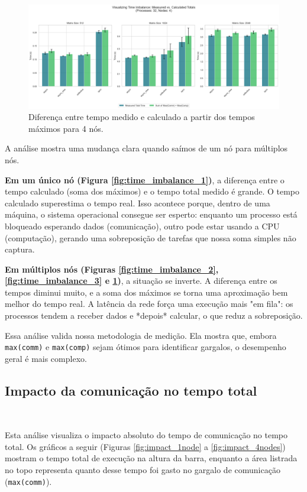 \documentclass{article}
\begin{document}
\begin{figure}[H]
    \centering
    \includegraphics[width=1.0\linewidth]{images/time_imbalance_4nodes.png}
    \caption{Diferença entre tempo medido e calculado a partir dos tempos máximos para 4 nós.}
    \label{fig:time_imbalance_4}
\end{figure}

A análise mostra uma mudança clara quando saímos de um nó para múltiplos nós.

\textbf{Em um único nó (Figura \ref{fig:time_imbalance_1})}, a diferença entre o tempo calculado (soma dos máximos) e o tempo total medido é grande. O tempo calculado superestima o tempo real. Isso acontece porque, dentro de uma máquina, o sistema operacional consegue ser esperto: enquanto um processo está bloqueado esperando dados (comunicação), outro pode estar usando a CPU (computação), gerando uma sobreposição de tarefas que nossa soma simples não captura.

\textbf{Em múltiplos nós (Figuras \ref{fig:time_imbalance_2}, \ref{fig:time_imbalance_3} e \ref{fig:time_imbalance_4})}, a situação se inverte. A diferença entre os tempos diminui muito, e a soma dos máximos se torna uma aproximação bem melhor do tempo real. A latência da rede força uma execução mais "em fila": os processos tendem a receber dados e *depois* calcular, o que reduz a sobreposição.

Essa análise valida nossa metodologia de medição. Ela mostra que, embora \texttt{max(comm)} e \texttt{max(comp)} sejam ótimos para identificar gargalos, o desempenho geral é mais complexo.

\subsection{Impacto da comunicação no tempo total}
\

Esta análise visualiza o impacto absoluto do tempo de comunicação no tempo total. Os gráficos a seguir (Figuras \ref{fig:impact_1node} a \ref{fig:impact_4nodes}) mostram o tempo total de execução na altura da barra, enquanto a área listrada no topo representa quanto desse tempo foi gasto no gargalo de comunicação (\texttt{max(comm)}).
\end{document}
